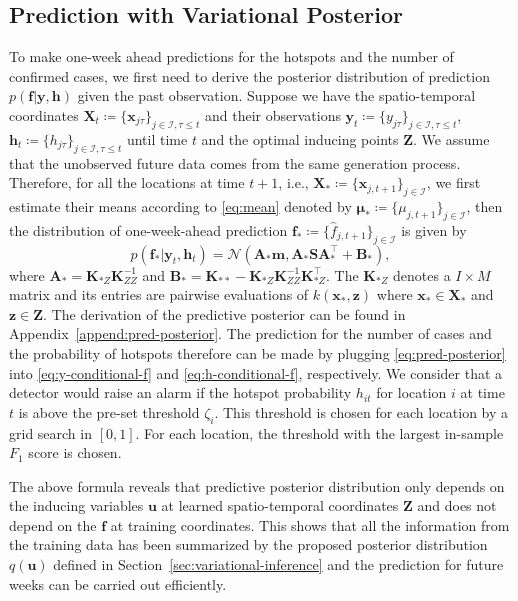 \documentclass[journal]{IEEEtran}
\begin{document}
\subsection{Prediction with Variational Posterior}

To make one-week ahead predictions for the hotspots and the number of confirmed cases, we first need to derive the posterior distribution of prediction $p(\mathbf{f}|\mathbf{y}, \mathbf{h})$ given the past observation.
Suppose we have the spatio-temporal coordinates $\mathbf{X}_t \coloneqq \{\mathbf{x}_{j\tau}\}_{j\in\mathscr{I}, \tau\le t}$ and their observations $\mathbf{y}_t \coloneqq \{y_{j\tau}\}_{j\in\mathscr{I}, \tau\le t}$, $\mathbf{h}_t \coloneqq \{h_{j\tau}\}_{j\in\mathscr{I}, \tau\le t}$ until time $t$ and the optimal inducing points $\mathbf{Z}$.
We assume that the unobserved future data comes from the same generation process.
Therefore, for all the locations at time $t+1$, i.e., $\mathbf X_* \coloneqq \{\mathbf{x}_{j,t+1}\}_{j\in\mathscr{I}}$, we first estimate their means according to \eqref{eq:mean} denoted by $\boldsymbol{\mu}_* \coloneqq \{\mu_{j,t+1}\}_{j\in\mathscr{I}}$, then the distribution of one-week-ahead prediction $\mathbf f_* \coloneqq \{\hat f_{j, t+1}\}_{j\in\mathscr{I}}$ is given by 
\begin{equation}
    p(\mathbf f_* | \mathbf{y}_t, \mathbf{h}_t) 
    = \mathcal{N}(\mathbf{A}_* \mathbf{m}, \mathbf{A}_* \mathbf{S} \mathbf{A}_*^\top + \mathbf{B}_*),
    \label{eq:pred-posterior}
\end{equation}
where $\mathbf{A}_* = \mathbf{K}_{*Z}\mathbf{K}_{ZZ}^{-1}$ and $\mathbf{B}_* = \mathbf{K}_{**} - \mathbf{K}_{*Z} \mathbf{K}_{ZZ}^{-1} \mathbf{K}_{*Z}^\top$.
The $\mathbf{K}_{* Z}$ denotes a $I \times M$ matrix and its entries are pairwise evaluations of $k(\mathbf{x}_*, \mathbf{z})$ where $\mathbf{x}_* \in \mathbf{X}_*$ and $\mathbf{z} \in \mathbf{Z}$. The derivation of the predictive posterior can be found in Appendix~\ref{append:pred-posterior}. The prediction for the number of cases and the probability of hotspots therefore can be made by plugging \eqref{eq:pred-posterior} into \eqref{eq:y-conditional-f} and \eqref{eq:h-conditional-f}, respectively.
We consider that a detector would raise an alarm if the hotspot probability $h_{it}$ for location $i$ at time $t$ is above the pre-set threshold $\zeta_i$. This threshold is chosen for each location by a grid search in $[0, 1]$. For each location, the threshold with the largest in-sample $F_1$ score is chosen.

The above formula reveals that predictive posterior distribution only depends on the inducing variables $\mathbf{u}$ at learned spatio-temporal coordinates $\mathbf{Z}$ and does not depend on the $\mathbf{f}$ at training coordinates. 
This shows that all the information from the training data has been summarized by the proposed posterior distribution $q(\mathbf{u})$ defined in Section~\ref{sec:variational-inference} and the prediction for future weeks can be carried out efficiently. 
\end{document}
